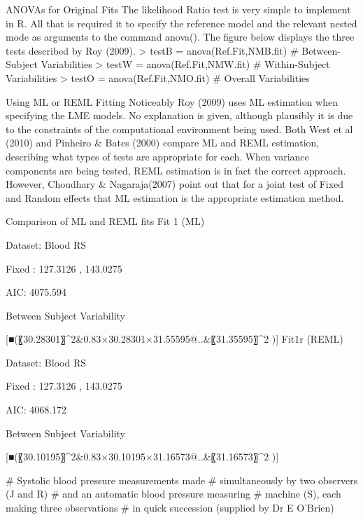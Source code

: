 ANOVAs  for  Original Fits
The likelihood Ratio test is very simple to implement in R. All that is required it to specify the reference model and the relevant nested mode as arguments to the command anova().
The figure below displays the three tests described by Roy (2009).
> testB    = anova(Ref.Fit,NMB.fit)                          # Between-Subject Variabilities
> testW   = anova(Ref.Fit,NMW.fit)                        # Within-Subject Variabilities
> testO     = anova(Ref.Fit,NMO.fit)                        # Overall Variabilities



Using ML or REML Fitting
Noticeably Roy (2009) uses ML estimation when specifying the LME models. No explanation is given, although plausibly it is due to the constraints of the computational environment being used.
Both West et al (2010) and Pinheiro & Bates (2000) compare ML and REML estimation, describing what types of tests are appropriate for each.  When variance components are being tested, REML estimation is in fact the correct approach. 
However, Choudhary & Nagaraja(2007) point out  that for a joint test of Fixed and Random effects that ML estimation is the appropriate estimation method.


Comparison of ML and REML fits
Fit 1 (ML)

Dataset: Blood RS

Fixed : 127.3126 , 143.0275

AIC: 4075.594

Between Subject Variability

[■(〖30.28301〗^2&0.83×30.28301×31.55595@..&〖31.35595〗^2 )]	Fit1r (REML)

Dataset: Blood RS

Fixed : 127.3126 , 143.0275

AIC: 4068.172

Between Subject Variability

[■(〖30.10195〗^2&0.83×30.10195×31.16573@..&〖31.16573〗^2 )]



# Systolic blood pressure measurements made 
# simultaneously by two observers (J and R) 
# and an automatic blood pressure measuring
# machine (S), each making three observations 
# in quick succession (supplied by Dr E O'Brien)

